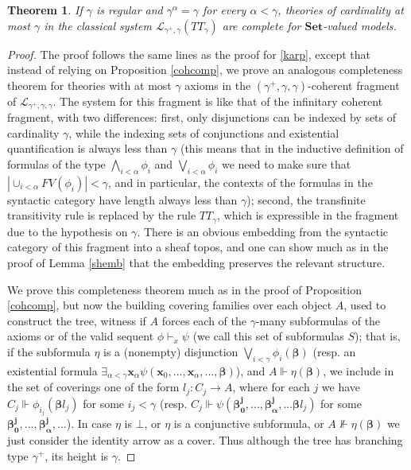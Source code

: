 \documentclass[a4paper,11pt]{article}
\theoremstyle{plain}
\newtheorem{thm}{Theorem}[subsection]
\theoremstyle{plain}
\theoremstyle{remark}
\newcommand{\Sets}{\ensuremath{\mathbf{Set}}}
\begin{document}
\begin{thm}\label{karp2}
If $\gamma$ is regular and $\gamma^\alpha=\gamma$ for every $\alpha<\gamma$, theories of cardinality at most $\gamma$ in the classical system $\mathcal{L}_{\gamma^+, \gamma}(TT_{\gamma})$ are complete for \Sets-valued models.
\end{thm}

\begin{proof}
The proof follows the same lines as the proof for \ref{karp}, except that instead of relying on Proposition \ref{cohcomp}, we prove an analogous completeness theorem for theories with at most $\gamma$ axioms in the $(\gamma^+, \gamma, \gamma)$-coherent fragment of $\mathcal{L}_{\gamma^+, \gamma, \gamma}$. The system for this fragment is like that of the infinitary coherent fragment, with two differences: first, only disjunctions can be indexed by sets of cardinality $\gamma$, while the indexing sets of conjunctions and existential quantification is always less than $\gamma$ (this means that in the inductive definition of formulas of the type $\bigwedge_{i<\alpha} \phi_i$ and $\bigvee_{i<\alpha} \phi_i$ we need to make sure that $|\cup_{i<\alpha}FV(\phi_i)|<\gamma$, and in particular, the contexts of the formulas in the syntactic category have length always less than $\gamma$); second, the transfinite transitivity rule is replaced by the rule $TT_{\gamma}$, which is expressible in the fragment due to the hypothesis on $\gamma$. There is an obvious embedding from the syntactic category of this fragment into a sheaf topos, and one can show much as in the proof of Lemma \ref{shemb} that the embedding preserves the relevant structure.

We prove this completeness theorem much as in the proof of Proposition \ref{cohcomp}, but now the building covering families over each object $A$, used to construct the tree, witness if $A$ forces each of the $\gamma$-many subformulas of the axioms or of the valid sequent $\phi \vdash_x \psi$ (we call this set of subformulas $S$); that is, if the subformula $\eta$ is a (nonempty) disjunction $\bigvee_{i<\gamma}\phi_i(\boldsymbol{\beta})$ (resp. an existential formula $\exists_{\alpha<\gamma}\mathbf{x}_{\alpha}\psi(\mathbf{x}_0, ...,\mathbf{x}_{\alpha}, ..., \boldsymbol{\beta})$), and $A \Vdash \eta(\boldsymbol{\beta})$, we include in the set of coverings one of the form $l_j: C_j \to A$, where for each $j$ we have $C_j \Vdash \phi_{i_j}(\boldsymbol{\beta} l_j)$ for some $i_j<\gamma$ (resp. $C_j \Vdash \psi(\boldsymbol{\beta_0^j}, ..., \boldsymbol{\beta_{\alpha}^j}, ... \boldsymbol{\beta} l_j)$ for some $\boldsymbol{\beta_0^j}, ..., \boldsymbol{\beta_{\alpha}^j}, ...$). In case $\eta$ is $\bot$, or $\eta$ is a conjunctive subformula, or $A \nVdash \eta(\boldsymbol{\beta})$ we just consider the identity arrow as a cover. Thus although the tree has branching type $\gamma^+$, its height is $\gamma$.


\end{proof}
\end{document}
